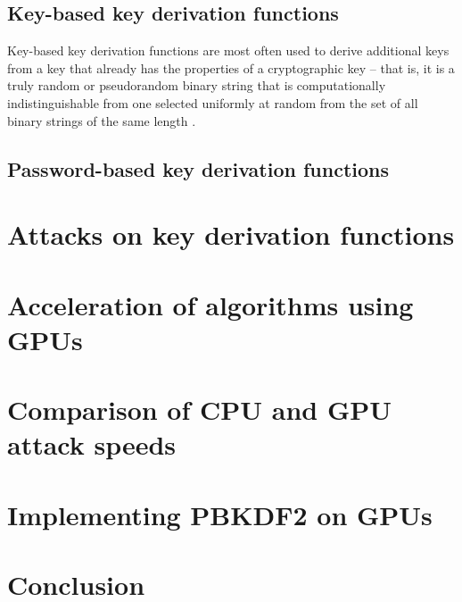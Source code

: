 \documentclass[12pt,oneside]{fithesis2}
\begin{document}
      \section{Key-based key derivation functions}
      Key-based key derivation functions are most often used to derive additional keys from a key that already has the properties of a cryptographic key -- that is, it is a truly random or pseudorandom binary string that is computationally indistinguishable from one selected uniformly at random from the set of all binary strings of the same length \cite{nist:sp800:108}.
      
      
      \section{Password-based key derivation functions}
      
    \chapter{Attacks on key derivation functions}
    \chapter{Acceleration of algorithms using GPUs}
    \chapter{Comparison of CPU and GPU attack speeds}
    \chapter{Implementing PBKDF2 on GPUs}
    \chapter{Conclusion}
    
    \iffalse
    \appendix
    \chapter{First appendix}        %
    TODO
    \chapter{Another appendix}
    TODO
    \fi
    
    
    
    
\end{document}
